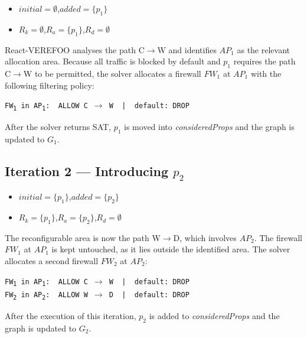 \begin{itemize}
  \item $\mathit{initial} = \emptyset$,\quad $\mathit{added} = \{p_1\}$
  \item $R_k = \emptyset$,\quad $R_a = \{p_1\}$,\quad $R_d = \emptyset$
\end{itemize}

React-VEREFOO analyses the path C$\to$W and identifies $\mathit{AP}_1$ as the relevant allocation area. Because all traffic is blocked by default and $p_1$ requires the path C$\to$W to be permitted, the solver allocates a firewall $\mathit{FW}_1$ at $\mathit{AP}_1$ with the following filtering policy:

\begin{center}
\texttt{FW\textsubscript{1} in AP\textsubscript{1}:\ \ ALLOW C\,$\to$\,W\ \ |\ \ default: DROP}
\end{center}

After the solver returns SAT, $p_1$ is moved into \textit{consideredProps} and the graph is updated to $G_1$.

\subsection{Iteration 2 — Introducing \texorpdfstring{$p_2$}{p2}}

\begin{itemize}
  \item $\mathit{initial} = \{p_1\}$,\quad $\mathit{added} = \{p_2\}$
  \item $R_k = \{p_1\}$,\quad $R_a = \{p_2\}$,\quad $R_d = \emptyset$
\end{itemize}

The reconfigurable area is now the path W$\to$D, which involves $\mathit{AP}_2$. The firewall $\mathit{FW}_1$ at $\mathit{AP}_1$ is kept untouched, as it lies outside the identified area. The solver allocates a second firewall $\mathit{FW}_2$ at $\mathit{AP}_2$:

\begin{center}
\texttt{FW\textsubscript{1} in AP\textsubscript{1}:\ \ ALLOW C\,$\to$\,W\ \ |\ \ default: DROP} \\[4pt]
\texttt{FW\textsubscript{2} in AP\textsubscript{2}:\ \ ALLOW W\,$\to$\,D\ \ |\ \ default: DROP}
\end{center}

After the execution of this iteration, $p_2$ is added to \textit{consideredProps} and the graph is updated to $G_2$.

